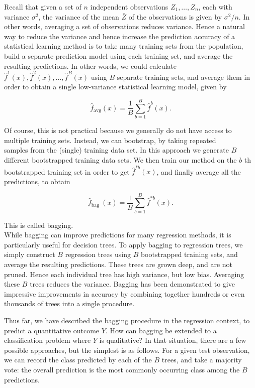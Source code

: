 \documentclass[10pt]{article}
\begin{document}
Recall that given a set of $n$ independent observations $Z_{1}, \ldots, Z_{n}$, each with variance $\sigma^{2}$, the variance of the mean $\bar{Z}$ of the observations is given by $\sigma^{2} / n$. In other words, averaging a set of observations reduces variance. Hence a natural way to reduce the variance and hence increase the prediction accuracy of a statistical learning method is to take many training sets from the population, build a separate prediction model using each training set, and average the resulting predictions. In other words, we could calculate $\hat{f}^{1}(x), \hat{f}^{2}(x), \ldots, \hat{f}^{B}(x)$ using $B$ separate training sets, and average them in order to obtain a single low-variance statistical learning model, given by

$$
\hat{f}_{\mathrm{avg}}(x)=\frac{1}{B} \sum_{b=1}^{B} \hat{f}^{b}(x) .
$$

Of course, this is not practical because we generally do not have access to multiple training sets. Instead, we can bootstrap, by taking repeated\\
samples from the (single) training data set. In this approach we generate $B$ different bootstrapped training data sets. We then train our method on the $b$ th bootstrapped training set in order to get $\hat{f}^{* b}(x)$, and finally average all the predictions, to obtain

$$
\hat{f}_{\text {bag }}(x)=\frac{1}{B} \sum_{b=1}^{B} \hat{f}^{* b}(x) .
$$

This is called bagging.\\
While bagging can improve predictions for many regression methods, it is particularly useful for decision trees. To apply bagging to regression trees, we simply construct $B$ regression trees using $B$ bootstrapped training sets, and average the resulting predictions. These trees are grown deep, and are not pruned. Hence each individual tree has high variance, but low bias. Averaging these $B$ trees reduces the variance. Bagging has been demonstrated to give impressive improvements in accuracy by combining together hundreds or even thousands of trees into a single procedure.

Thus far, we have described the bagging procedure in the regression context, to predict a quantitative outcome $Y$. How can bagging be extended to a classification problem where $Y$ is qualitative? In that situation, there are a few possible approaches, but the simplest is as follows. For a given test observation, we can record the class predicted by each of the $B$ trees, and take a majority vote: the overall prediction is the most commonly occurring class among the $B$ predictions.
\end{document}
